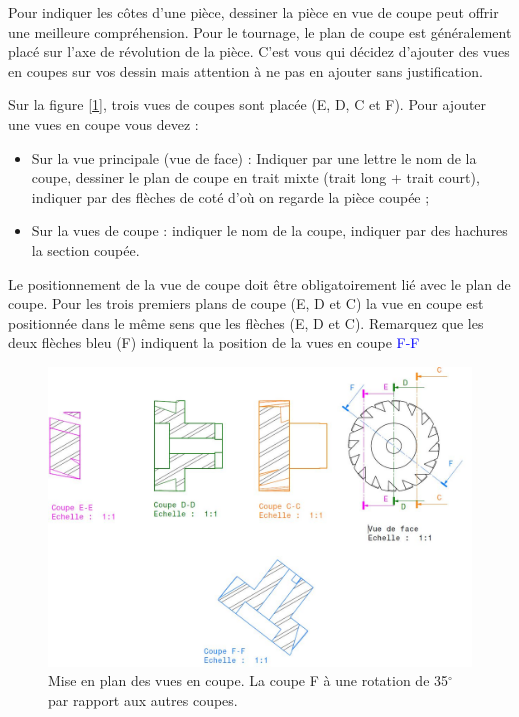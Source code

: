 \documentclass[
	11pt, %
	fleqn, %
	a4paper, %
]{LegrandOrangeBook}
\begin{document}
Pour indiquer les côtes d'une pièce, dessiner la pièce en vue de coupe peut offrir une meilleure compréhension. Pour le tournage, le plan de coupe est généralement placé sur l'axe de révolution de la pièce. C'est vous qui décidez d'ajouter des vues en coupes sur vos dessin mais attention à ne pas en ajouter sans justification. \\

\begin{theorem}

    Sur la figure [\ref{Coupe_couleur}], trois vues de coupes sont placée (E, D, C et F). Pour ajouter une vues en coupe vous devez :
    \begin{itemize}
        \item Sur la vue principale (vue de face) : Indiquer par une lettre le nom de la coupe, dessiner le plan de coupe en trait mixte (trait long + trait court), indiquer par des flèches de coté d'où on regarde la pièce coupée ;
        \item Sur la vues de coupe : indiquer le nom de la coupe, indiquer par des hachures la section coupée. 
    \end{itemize}

        
    Le positionnement de la vue de coupe doit être obligatoirement lié avec le plan de coupe. Pour les trois premiers plans de coupe (E, D et C) la vue en coupe est positionnée dans le même sens que les flèches (E, D et C). Remarquez que les deux flèches bleu (F) indiquent la position de la vues en coupe \textcolor{Blue}{F-F}
    
\end{theorem}





\begin{figure}[H] %
	\centering %
	\includegraphics[width=1\textwidth]{Images/coupe_couleur.JPG} %
	\caption{Mise en plan des vues en coupe. La coupe F à une rotation de 35$^{\circ}$ par rapport aux autres coupes.}
	\label{Coupe_couleur} %
\end{figure}
\end{document}
